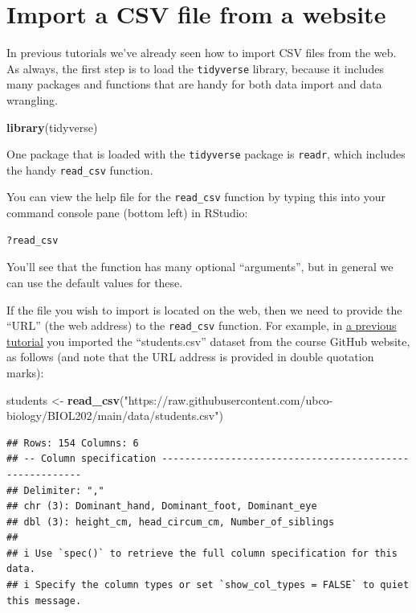 \documentclass[
]{book}
\newenvironment{Shaded}{\begin{snugshade}}{\end{snugshade}}
\newcommand{\FunctionTok}[1]{\textcolor[rgb]{0.13,0.29,0.53}{\textbf{#1}}}
\newcommand{\NormalTok}[1]{#1}
\newcommand{\OtherTok}[1]{\textcolor[rgb]{0.56,0.35,0.01}{#1}}
\newcommand{\StringTok}[1]{\textcolor[rgb]{0.31,0.60,0.02}{#1}}
\begin{document}
\section{Import a CSV file from a website}\label{import_csv_url}

In previous tutorials we've already seen how to import CSV files from the web. As always, the first step is to load the \texttt{tidyverse} library, because it includes many packages and functions that are handy for both data import and data wrangling.

\begin{Shaded}
\begin{Highlighting}[]
\FunctionTok{library}\NormalTok{(tidyverse)}
\end{Highlighting}
\end{Shaded}

One package that is loaded with the \texttt{tidyverse} package is \texttt{readr}, which includes the handy \texttt{read\_csv} function.

You can view the help file for the \texttt{read\_csv} function by typing this into your command console pane (bottom left) in RStudio:

\begin{verbatim}
?read_csv
\end{verbatim}

You'll see that the function has many optional ``arguments'', but in general we can use the default values for these.

If the file you wish to import is located on the web, then we need to provide the ``URL'' (the web address) to the \texttt{read\_csv} function. For example, in \hyperref[example_answer]{a previous tutorial} you imported the ``students.csv'' dataset from the course GitHub website, as follows (and note that the URL address is provided in double quotation marks):

\begin{Shaded}
\begin{Highlighting}[]
\NormalTok{students }\OtherTok{\textless{}{-}} \FunctionTok{read\_csv}\NormalTok{(}\StringTok{"https://raw.githubusercontent.com/ubco{-}biology/BIOL202/main/data/students.csv"}\NormalTok{)}
\end{Highlighting}
\end{Shaded}

\begin{verbatim}
## Rows: 154 Columns: 6
## -- Column specification --------------------------------------------------------
## Delimiter: ","
## chr (3): Dominant_hand, Dominant_foot, Dominant_eye
## dbl (3): height_cm, head_circum_cm, Number_of_siblings
## 
## i Use `spec()` to retrieve the full column specification for this data.
## i Specify the column types or set `show_col_types = FALSE` to quiet this message.
\end{verbatim}
\end{document}
